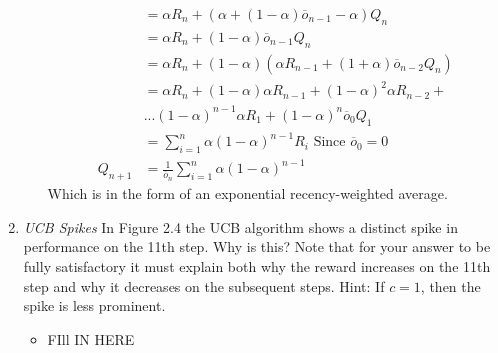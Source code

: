 \documentclass{article}
\begin{document}
\begin{enumerate}
\begin{itemize}
\begin{align}
            &= \alpha R_n + (\alpha + (1 - \alpha)\overline{o}_{n-1} - \alpha) Q_n \\
            &= \alpha R_n + (1 - \alpha)\overline{o}_{n-1} Q_n \\
            &= \alpha R_n+ (1 - \alpha)(\alpha R_{n-1} + (1 + \alpha)\overline{o}_{n-2} Q_n) \\
            &= \alpha R_n + (1 - \alpha)\alpha R_{n-1} + (1-\alpha)^2 \alpha R_{n-2} + \\ &... (1-\alpha)^{n-1}\alpha R_1 + (1-\alpha)^{n}\overline{o}_0 Q_1 \\
            &= \sum^{n}_{i=1} \alpha (1 - \alpha)^{n-1} R_i \text{ Since $\overline{o}_0 = 0$} \\
            Q_{n+1} &= \frac{1}{\overline{o}_n} \sum^{n}_{i=1} \alpha (1 - \alpha)^{n-1}
        \end{align}
        Which is in the form of an exponential recency-weighted average.
    \end{itemize}

    \item \emph{UCB Spikes} In Figure 2.4 the UCB algorithm shows a distinct spike in performance on the 11th step. Why is this? Note that for your answer to be fully satisfactory it must explain both why the reward increases on the 11th step and why it decreases on the subsequent steps. Hint: If $c=1$, then the spike is less prominent.
    \begin{itemize}
        \item FIll IN HERE
    \end{itemize}

\end{enumerate}
\end{document}
